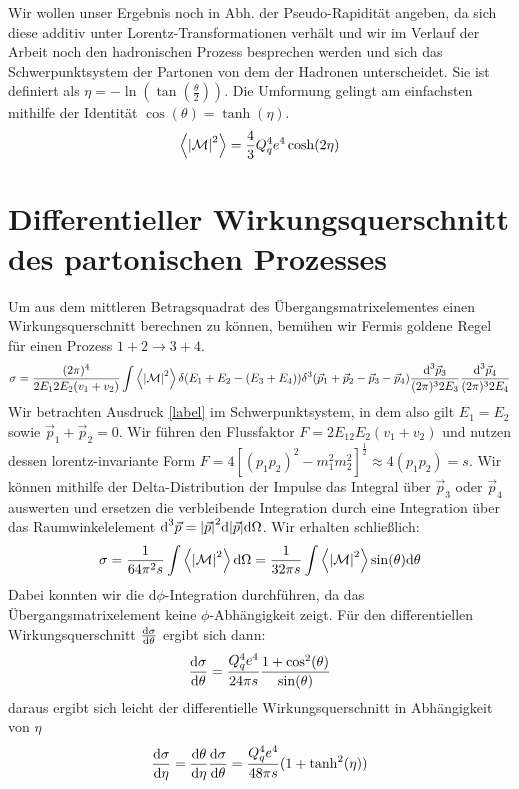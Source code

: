 Wir wollen unser Ergebnis noch in Abh. der Pseudo-Rapidität angeben, da sich diese additiv unter Lorentz-Transformationen verhält und wir im Verlauf der Arbeit noch den hadronischen Prozess besprechen werden und sich das Schwerpunktsystem der Partonen von dem der Hadronen unterscheidet. Sie ist definiert als $\eta = -\ln\left(\tan\left(\frac{\theta}{2}\right)\right)$. Die Umformung gelingt am einfachsten mithilfe der Identität $\cos(\theta) = \tanh(\eta)$.
\begin{equation}
	\left\langle  \abs{\mathcal{M}}^2\right\rangle = \frac{4}{3} Q_q^4e^4\cosh(2\eta)
\end{equation}

\section{Differentieller Wirkungsquerschnitt des partonischen Prozesses}
Um aus dem mittleren Betragsquadrat des Übergangsmatrixelementes einen Wirkungsquerschnitt berechnen zu können, bemühen wir Fermis goldene Regel für einen Prozess $ 1 + 2 \rightarrow 3 + 4$.
\begin{equation}
	\sigma = \frac{(2\pi)^4}{2E_12E_2(v_1 + v_2)}\int \left\langle  \abs{\mathcal{M}}^2\right\rangle \delta(E_1 + E_2 - (E_3 + E_4)) \delta^3(\vec{p}_1 +\vec{p}_2 - \vec{p}_3 - \vec{p}_4) \frac{\text{d}^3\vec{p}_3}{(2\pi)^32E_3}\frac{\text{d}^3\vec{p}_4}{(2\pi)^32E_4}
\end{equation}
Wir betrachten Ausdruck \autoref{label} im Schwerpunktsystem, in dem also gilt $E_1 = E_2$ sowie $\vec{p}_1 + \vec{p}_2 = 0$. Wir führen den Flussfaktor $F = 2E_12E_2(v_1 + v_2)$ und nutzen dessen lorentz-invariante Form $F = 4\left[(p_1p_2)^2-m_1^2m_2^2\right]^{\frac{1}{2}} \approx 4(p_1p_2) = s$. Wir können mithilfe der Delta-Distribution der Impulse das Integral über $\vec{p}_3$ oder $\vec{p}_4$ auswerten und ersetzen die verbleibende Integration durch eine Integration über das Raumwinkelelement $\text{d}^3\vec{p} = \abs{\vec{p}}^2 \text{d}\abs{\vec{p}}\text{d}\Omega$. Wir erhalten schließlich:
\begin{equation}
	\sigma = \frac{1}{64\pi^2s} \int \left\langle  \abs{\mathcal{M}}^2\right\rangle \text{d}\Omega = \frac{1}{32\pi s} \int \left\langle  \abs{\mathcal{M}}^2\right\rangle \sin(\theta) \text{d}\theta
\end{equation}
Dabei konnten wir die $\text{d}\phi$-Integration durchführen, da das Übergangsmatrixelement keine $\phi$-Abhängigkeit zeigt. Für den differentiellen Wirkungsquerschnitt $\derivative{\sigma}{\theta}$ ergibt sich dann:
\begin{equation}
	\derivative{\sigma}{\theta} = \frac{Q_q^4e^4}{24\pi s}\frac{1+\cos^2(\theta)}{\sin(\theta)}
\end{equation}
daraus ergibt sich leicht der differentielle Wirkungsquerschnitt in Abhängigkeit von $\eta$
\begin{equation}
	\derivative{\sigma}{\eta} =\derivative{\theta}{\eta}\derivative{\sigma}{\theta} =  \frac{Q_q^4e^4}{48\pi s}(1+\tanh^2(\eta))
\end{equation}

